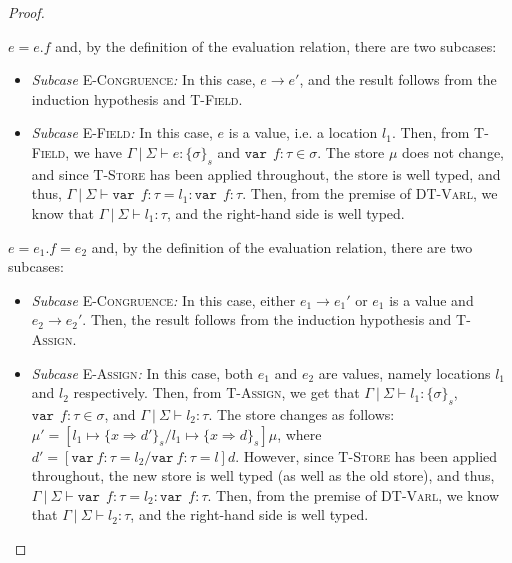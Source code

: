 \documentclass{llncs}
\newcommand{\keywadj}[1]{\mathtt{#1}}
\newcommand{\keyw}[1]{\keywadj{#1}~}
\newcommand{\pcase}[1][]{
  \if\relax\detokenize{#1}\relax
    \def\thiscase{}
  \else
    \def\thiscase{~#1}
  \fi
  \item
}
\begin{document}
\begin{proof}
\begin{pcases}
\pcase[\textsc{T-Field}]
$e = e.f$ and, by the definition of the evaluation relation, there are two subcases:
\\
\begin{itemize}
\item[]  \textit{Subcase} \textsc{E-Congruence}\textit{:} In this case, $e \longrightarrow e'$, and the result follows from the induction hypothesis and \textsc{T-Field}.
\\
\item[]  \textit{Subcase} \textsc{E-Field}\textit{:} In this case, $e$ is a value, i.e. a location $l_1$. Then, from  \textsc{T-Field}, we have $\Gamma~|~\Sigma \vdash e : \{\sigma\}_s$ and $\keyw{var}~ f : \tau \in \sigma$. The store $\mu$ does not change, and since \textsc{T-Store} has been applied throughout, the store is well typed, and thus, \mbox{$\Gamma~|~\Sigma \vdash \keyw{var}~ f : \tau = l_1 : \keyw{var}~ f : \tau$}. Then, from the premise of \textsc{DT-Varl}, we know that $\Gamma~|~\Sigma \vdash l_1 : \tau$, and the right-hand side is well typed.
\\
\end{itemize}

\pcase[\textsc{T-Assign}]
$e = e_1.f=e_2$ and, by the definition of the evaluation relation, there are two subcases:
\\
\begin{itemize}
\item[]  \textit{Subcase} \textsc{E-Congruence}\textit{:} In this case, either $e_1 \longrightarrow e_1'$ or $e_1$ is a value and $e_2 \longrightarrow e_2'$. Then, the result follows from the induction hypothesis and \textsc{T-Assign}.
\\
\item[]  \textit{Subcase} \textsc{E-Assign}\textit{:} In this case, both $e_1$ and $e_2$ are values, namely locations $l_1$ and $l_2$ respectively. Then, from \textsc{T-Assign}, we get that $\Gamma~|~\Sigma \vdash l_1 : \{\sigma\}_s$, $\keyw{var}~ f : \tau \in \sigma$, and $\Gamma~|~\Sigma \vdash l_2 : \tau$. The store changes as follows: $\mu' = [l_1 \mapsto \{ x \Rightarrow d' \}_{s}/l_1 \mapsto \{ x \Rightarrow d \}_{s}]\mu$, where $d' = [\keyw{var} f:\tau = l_2/\keyw{var} f:\tau = l]d$. However, since \textsc{T-Store} has been applied throughout, the new store is well typed (as well as the old store), and thus, \mbox{$\Gamma~|~\Sigma \vdash \keyw{var}~ f : \tau = l_2 : \keyw{var}~ f : \tau$}. Then, from the premise of \textsc{DT-Varl}, we know that $\Gamma~|~\Sigma \vdash l_2 : \tau$, and the right-hand side is well typed.
\\
\end{itemize}


\end{pcases}
\end{proof}
\end{document}
